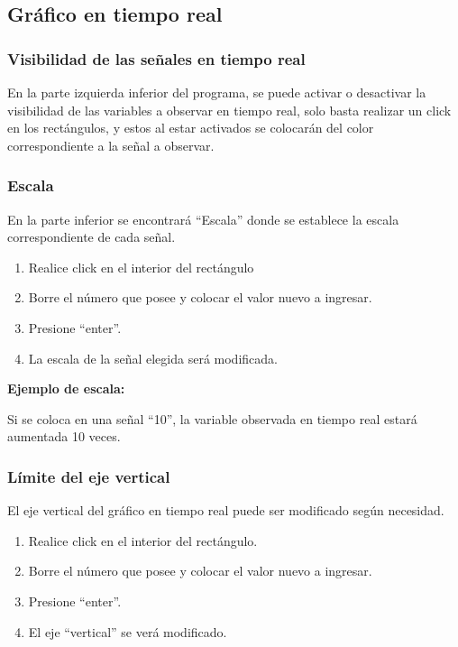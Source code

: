 \subsection{Gráfico en tiempo real}
\subsubsection{	Visibilidad de las señales en tiempo real}
En la parte izquierda inferior del programa, se puede activar o desactivar la visibilidad de las variables a observar en tiempo real, solo basta realizar un click en los rectángulos, y estos al estar activados se colocarán del color correspondiente a la señal a observar.

\subsubsection{Escala}
En la parte inferior se encontrará “Escala” donde se establece la escala correspondiente de cada señal.
\begin{enumerate}
	\item Realice click en el interior del rectángulo
	\item Borre el número que posee y colocar el valor nuevo a ingresar.
	\item Presione “enter”.
	\item La escala de la señal elegida será modificada.
	
\end{enumerate}

\textbf{Ejemplo de escala:}

Si se coloca en una señal “10”, la variable observada en tiempo real estará aumentada 10 veces.

\subsubsection{Límite del eje vertical}
El eje vertical del gráfico en tiempo real puede ser modificado según necesidad.

\begin{enumerate}
	\item Realice click en el interior del rectángulo.
	\item Borre el número que posee y colocar el valor nuevo a ingresar.
	\item Presione “enter”.
	\item El eje “vertical” se verá modificado.
	
\end{enumerate}


